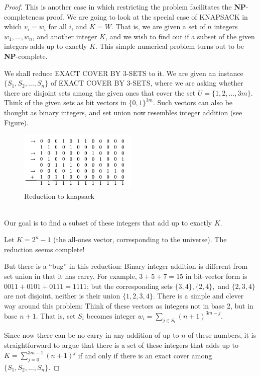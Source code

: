 \documentclass[12pt]{article}
\begin{document}
\begin{proof}
  This is another case in which restricting the problem facilitates the \textbf{NP}-completeness proof. We are going to look at the special case of \textsc{KNAPSACK} in which $v_i = w_i$ for all $i$, and $K = W$. That is, we are given a set of $n$ integers $w_1, \ldots, w_n$, and another integer $K$, and we wish to find out if a subset of the given integers adds up to exactly $K$. This simple numerical problem turns out to be \textbf{NP}-complete.

We shall reduce \textsc{EXACT COVER BY 3-SETS} to it. We are given an instance $\{S_1, S_2, \ldots, S_n\}$ of \textsc{EXACT COVER BY 3-SETS}, where we are asking whether there are disjoint sets among the given ones that cover the set $U = \{1, 2, \ldots, 3m\}$. Think of the given sets as bit vectors in $\{0, 1\}^{3m}$. Such vectors can also be thought as binary integers, and set union now resembles integer addition (see Figure).
\begin{figure}[ht]
  \centering
  \includegraphics[width=0.5\textwidth]{img/knapsack.png}
  \caption{Reduction to knapsack}
\end{figure}
\\
 Our goal is to find a subset of these integers that add up to exactly $K$.

Let $K = 2^n - 1$ (the all-ones vector, corresponding to the universe). The reduction seems complete!

But there is a ``bug'' in this reduction: Binary integer addition is different from set union in that it has carry. For example, $3 + 5 + 7 = 15$ in bit-vector form is $0011 + 0101 + 0111 = 1111$; but the corresponding sets $\{3, 4\}, \{2, 4\},$ and $\{2, 3, 4\}$ are not disjoint, neither is their union $\{1, 2, 3, 4\}$. There is a simple and clever way around this problem: Think of these vectors as integers not in base 2, but in base $n + 1$. That is, set $S_i$ becomes integer $w_i = \sum_{j \in S_i} (n + 1)^{3m-j}$. 

Since now there can be no carry in any addition of up to $n$ of these numbers, it is straightforward to argue that there is a set of these integers that adds up to $K = \sum_{j=0}^{3m-1} (n + 1)^j$ if and only if there is an exact cover among $\{S_1, S_2, \ldots, S_n\}$. 
\end{proof}
\end{document}
